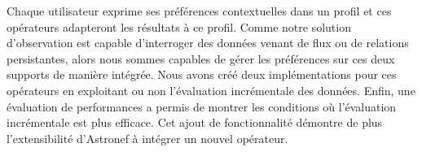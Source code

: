 Chaque utilisateur exprime ses préférences contextuelles dans un profil et ces opérateurs adapteront les résultats à ce profil. Comme notre solution d'observation est capable d'interroger des données venant de flux ou de relations persistantes, alors nous sommes capables de gérer les préférences sur ces deux supports de manière intégrée. Nous avons créé deux implémentations pour ces opérateurs en exploitant ou non l'évaluation incrémentale des données. Enfin, une évaluation de performances a permis de montrer les conditions où l'évaluation incrémentale est plus efficace. Cet ajout de fonctionnalité démontre de plus l'extensibilité d'Astronef à intégrer un nouvel opérateur.

